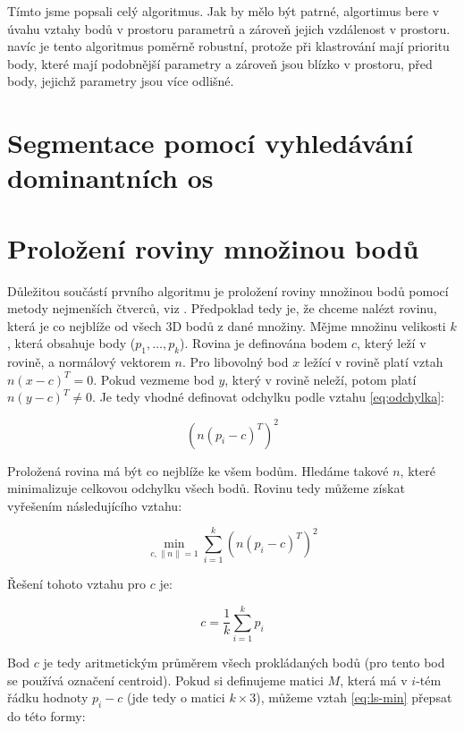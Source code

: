 \documentclass[11pt,twoside,a4paper]{book}
\begin{document}
Tímto jsme popsali celý algoritmus. Jak by mělo být patrné, algortimus bere v úvahu vztahy bodů v prostoru parametrů a zároveň jejich vzdálenost v prostoru. navíc je tento algoritmus poměrně robustní, protože při klastrování mají prioritu body, které mají podobnější parametry a zároveň jsou blízko v prostoru, před body, jejichž parametry jsou více odlišné.


\section{Segmentace pomocí vyhledávání dominantních os}

\cite{Seg02}


\section{Proložení roviny množinou bodů}
\label{sub:lsq}
Důležitou součástí prvního algoritmu je proložení roviny množinou bodů pomocí metody nejmenších čtverců, viz \cite{wiki:leastsq}. Předpoklad tedy je, že chceme nalézt rovinu, která je co nejblíže od všech 3D bodů z dané množiny. Mějme množinu velikosti $k$, která obsahuje body ($p_1, \ldots, p_k$). Rovina je definována bodem $c$, který leží v rovině, a normálový vektorem $n$. Pro libovolný bod $x$ ležící v rovině platí vztah $n(x - c)^T = 0$. Pokud vezmeme bod $y$, který v rovině neleží, potom platí $n(y - c)^T \neq 0$. Je tedy vhodné definovat odchylku podle vztahu \ref{eq:odchylka}:

\begin{equation}
\label{eq:odchylka}
(n (p_i - c)^T)^2
\end{equation}

Proložená rovina má být co nejblíže ke všem bodům. Hledáme takové $n$, které minimalizuje celkovou odchylku všech bodů. Rovinu tedy můžeme získat vyřešením následujícího vztahu:

\begin{equation}
\label{eq:ls-min}
\min_{c,\|n\|=1} \sum\limits_{i=1}^k (n (p_i - c)^T)^2
\end{equation}

Řešení tohoto vztahu pro $c$ je:

\begin{equation}
c = \frac{1}{k} \sum\limits_{i=1}^k p_i
\end{equation}

Bod $c$ je tedy aritmetickým průměrem všech prokládaných bodů (pro tento bod se používá označení centroid). Pokud si definujeme matici $M$, která má v $i$-tém řádku hodnoty $p_i - c$ (jde tedy o matici $k \times 3$), můžeme vztah  \ref{eq:ls-min} přepsat do této formy:
\end{document}
